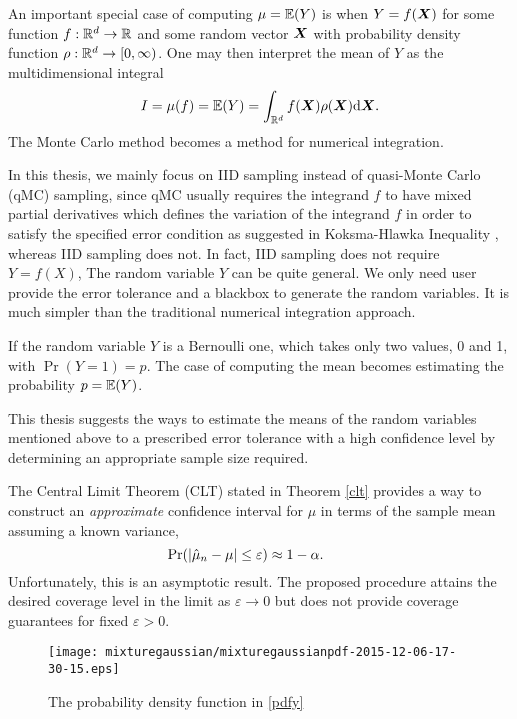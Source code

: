 \documentclass{iitthesis}
\theoremstyle{definition}
\begin{document}
An important special case of computing $\mu=\mathbb{E}(Y)$ is when $Y = f(\boldsymbol{X})$ for some function $f:\mathbb{R}^d \to \mathbb{R}$ and some random vector $\boldsymbol{X}$ with probability density function $\rho: \mathbb{R}^d \to [0,\infty)$. One may then interpret the mean of $Y$ as the multidimensional integral
\begin{align*}
I= \mu(f) = \mathbb{E}(Y) = \int_{\mathbb{R}^d}f(\boldsymbol{X})\rho(\boldsymbol{X}){\rm d} \boldsymbol{X}.
\end{align*}
The Monte Carlo method becomes a method for numerical integration.

In this thesis, we mainly focus on IID sampling instead of quasi-Monte Carlo (qMC) sampling, since qMC usually requires the integrand $f$ to have mixed partial derivatives which defines the variation of the integrand $f$ in order to satisfy the specified error condition as suggested in Koksma-Hlawka Inequality \cite{Hickernell14}, whereas IID sampling does not. In fact, IID sampling does not require $Y=f(X)$, The random variable $Y$ can be quite general. We only need user provide the error tolerance and a blackbox to generate the random variables. It is much simpler than the traditional numerical integration approach.

If the random variable $Y$ is a Bernoulli one, which takes only two values, 0 and 1, with  $\Pr(Y=1) =p$. The case of computing the mean becomes estimating the probability $p = \mathbb{E}(Y)$. 

This thesis suggests the ways to estimate the means of the random variables mentioned above to a prescribed error tolerance with a high confidence level by determining an appropriate sample size required. 


The Central Limit Theorem (CLT) stated in Theorem \ref{clt} provides a way to construct an \emph{approximate} confidence interval for $\mu$ in terms of the sample mean assuming a known variance,
\[
\Pr(\left \lvert \hat{\mu}_{n}-\mu \right \rvert \le \varepsilon) \approx 1- \alpha. \qquad \]
Unfortunately, this is an asymptotic result. The proposed procedure attains the desired coverage level in the limit as $\varepsilon\to 0$ but does not provide coverage guarantees for fixed $\varepsilon>0$.  

\begin{figure}[htbp]
\centering
\begin{minipage}{7cm}\centering 
\texttt{[image: mixturegaussian/mixturegaussianpdf-2015-12-06-17-30-15.eps]} 
\end{minipage}
\caption{The probability density function in \eqref{pdfy}}\label{fig:mixturegaussianpdf}
 \end{figure}
 
\end{document}
